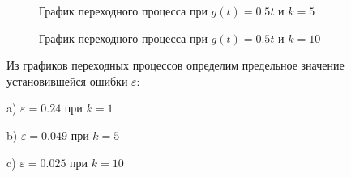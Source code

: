 \documentclass[a4paper, 11pt]{article}
\begin{document}
\begin{figure}[h!]
\caption{График переходного процесса при $g(t) = 0.5t$ и $k = 5$}
\label{ris:image}
\end{figure}

\newpage
\begin{figure}[h!]
\caption{График переходного процесса при $g(t) = 0.5t$ и $k = 10$}
\label{ris:image}
\end{figure}

\par 
Из графиков переходных процессов определим предельное значение установившейся ошибки $\varepsilon$:
\par 
a)	$\varepsilon = 0.24$ при $k = 1$
\par 
b)	$\varepsilon = 0.049$ при $k = 5$
\par 
c)	$\varepsilon = 0.025$ при $k = 10$
\end{document}

